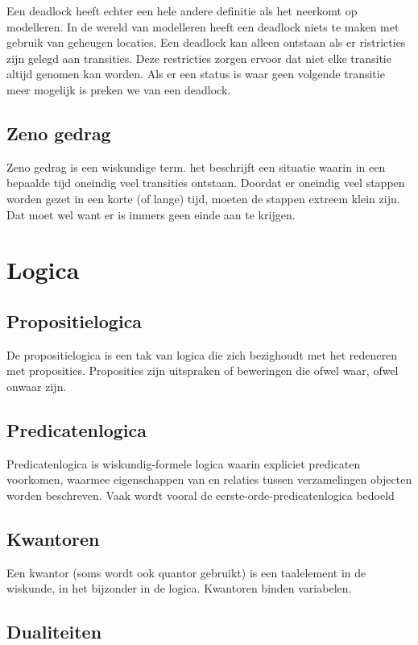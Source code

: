 \documentclass{article}%
\begin{document}
Een deadlock heeft echter een hele andere definitie als het neerkomt op modelleren. In de wereld van modelleren heeft een deadlock niets te maken met gebruik van geheugen locaties. Een deadlock kan alleen ontstaan als er ristricties zijn gelegd aan transities. Deze restricties zorgen ervoor dat niet elke transitie altijd genomen kan worden. Als er een status is waar geen volgende transitie meer mogelijk is preken we van een deadlock.

\subsection{Zeno gedrag}
Zeno gedrag is een wiskundige term. het beschrijft een situatie waarin in een bepaalde tijd oneindig veel transities ontstaan.\cite{sufficientconditions} Doordat er oneindig veel stappen worden gezet in een korte (of lange) tijd, moeten de stappen extreem klein zijn. Dat moet wel want er is immers geen einde aan te krijgen. 


\clearpage

\section{Logica}
\subsection{Propositielogica}
De propositielogica is een tak van logica die zich bezighoudt met het redeneren met proposities. Proposities zijn uitspraken of beweringen die ofwel waar, ofwel onwaar zijn.
\subsection{Predicatenlogica}
Predicatenlogica is wiskundig-formele logica waarin expliciet predicaten voorkomen, waarmee eigenschappen van en relaties tussen verzamelingen objecten worden beschreven. Vaak wordt vooral de eerste-orde-predicatenlogica bedoeld
\subsection{Kwantoren}
Een kwantor (soms wordt ook quantor gebruikt) is een taalelement in de wiskunde, in het bijzonder in de logica. Kwantoren binden variabelen.

\subsection{Dualiteiten}
\end{document}
